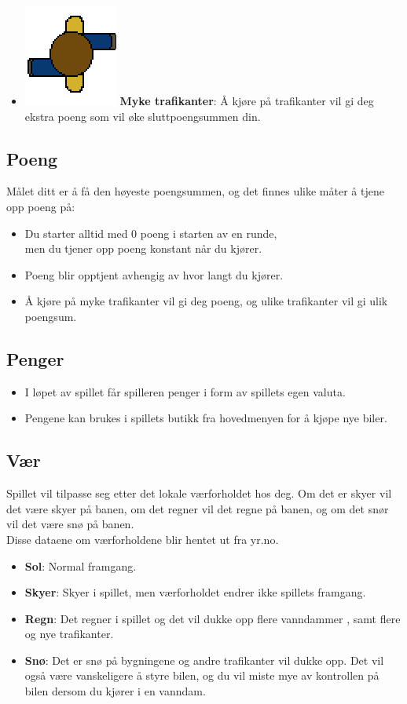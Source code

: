 \documentclass[paper=a4]{article}
\begin{document}
{\begin{itemize}
	\item \includegraphics[scale=0.4]{images/walker.png} \textbf{Myke trafikanter}: Å kjøre på trafikanter vil gi deg ekstra poeng som vil øke sluttpoengsummen din.
\end{itemize}
}

\subsection{Poeng}
Målet ditt er å få den høyeste poengsummen, og det finnes ulike måter å tjene opp poeng på:
\begin{itemize}
	\item Du starter alltid med 0 poeng i starten av en runde, \\men du tjener opp poeng konstant når du kjører.
	\item Poeng blir opptjent avhengig av hvor langt du kjører. 
	\item Å kjøre på myke trafikanter vil gi deg poeng, og ulike trafikanter vil gi ulik poengsum.
\end{itemize}

\subsection{Penger} 
\begin{itemize}
	\item{I løpet av spillet får spilleren penger i form av spillets egen valuta.}
	\item{Pengene kan brukes i spillets butikk fra hovedmenyen for å kjøpe nye biler.}
\end{itemize}

\subsection{Vær} 
Spillet vil tilpasse seg etter det lokale værforholdet hos deg. Om det er skyer vil det være skyer på banen,
om det regner vil det regne på banen, og om det snør vil det være snø på banen. \\
Disse dataene om værforholdene blir hentet ut fra yr.no. 
\begin{itemize} 
	\item \textbf{Sol}: Normal framgang.
	\item \textbf{Skyer}: Skyer i spillet, men værforholdet endrer ikke spillets framgang.
	\item \textbf{Regn}: Det regner i spillet og det vil dukke opp flere vanndammer	, samt flere og nye trafikanter. 
	\item \textbf{Snø}: Det er snø på bygningene og andre trafikanter vil dukke opp. Det vil også være vanskeligere å styre bilen,
 og du vil miste mye av kontrollen på bilen dersom du kjører i en vanndam.
\end{itemize}
\end{document}
